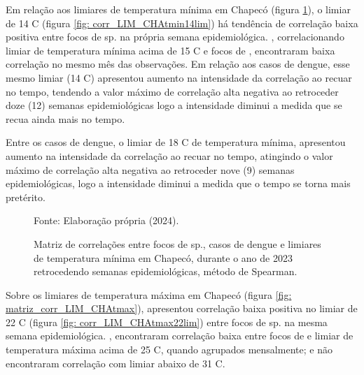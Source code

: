 \indent Em relação aos limiares de temperatura mínima em Chapecó (figura \ref{fig: matriz_corr_LIM_CHAtmin}), o limiar de 14 C (figura \ref{fig: corr_LIM_CHAtmin14lim}) há tendência de correlação baixa positiva entre focos de  sp. na própria semana epidemiológica. , correlacionando limiar de temperatura mínima acima de 15 C e focos de , encontraram baixa correlação no mesmo mês das observações. Em relação aos casos de dengue, esse mesmo limiar (14 C) apresentou aumento na intensidade da correlação ao recuar no tempo, tendendo a valor máximo de correlação alta negativa ao retroceder doze (12) semanas epidemiológicas logo a intensidade diminui a medida que se recua ainda mais no tempo.


\indent Entre os casos de dengue, o limiar de 18 C de temperatura mínima, apresentou aumento na intensidade da correlação ao recuar no tempo, atingindo o valor máximo de correlação alta negativa ao retroceder nove (9) semanas epidemiológicas, logo a intensidade diminui a medida que o tempo se torna mais pretérito.

\begin{figure}[htbp]
    \begin{center}
    \caption{Matriz de correlações entre focos de  sp., casos de dengue e limiares de temperatura mínima em Chapecó, durante o ano de 2023 retrocedendo semanas epidemiológicas, método de Spearman.}
    \label{fig: matriz_corr_LIM_CHAtmin}
        \hfill
    \end{center}
    \small{Fonte: Elaboração própria (2024).}
\end{figure}

\indent Sobre os limiares de temperatura máxima em Chapecó (figura \ref{fig: matriz_corr_LIM_CHAtmax}), apresentou correlação baixa positiva no limiar de 22 C (figura \ref{fig: corr_LIM_CHAtmax22lim}) entre focos de  sp. na mesma semana epidemiológica. , encontraram correlação baixa entre focos de  e limiar de temperatura máxima acima de 25 C, quando agrupados mensalmente; e não encontraram correlação com limiar abaixo de 31 C. 

